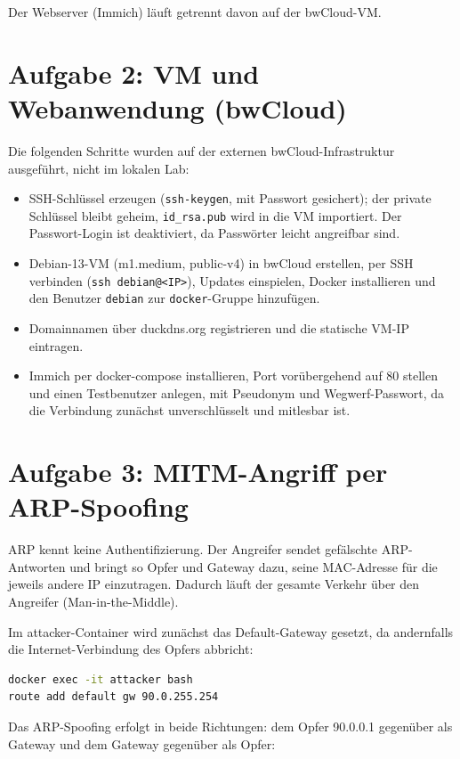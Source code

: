 \documentclass[
	fontsize=12pt,
	paper=a4,
	numbers=noenddot,
	listof=totoc,
	listof=entryprefix,
	listof=nochaptergap,
	bibliography=totoc,
	parskip=half,
	openany
]{scrbook}
\begin{document}
Der Webserver (Immich) läuft getrennt davon auf der bwCloud-VM.

\chapter*{Aufgabe 2: VM und Webanwendung (bwCloud)}

Die folgenden Schritte wurden auf der externen bwCloud-Infrastruktur ausgeführt,
nicht im lokalen Lab:

\begin{itemize}
	\item SSH-Schlüssel erzeugen (\texttt{ssh-keygen}, mit Passwort gesichert);
	      der private Schlüssel bleibt geheim, \texttt{id\_rsa.pub} wird in die
	      VM importiert. Der Passwort-Login ist deaktiviert, da Passwörter leicht
	      angreifbar sind.
	\item Debian-13-VM (m1.medium, public-v4) in bwCloud erstellen, per SSH
	      verbinden (\texttt{ssh debian@<IP>}), Updates einspielen, Docker
	      installieren und den Benutzer \texttt{debian} zur \texttt{docker}-Gruppe
	      hinzufügen.
	\item Domainnamen über duckdns.org registrieren und die statische VM-IP
	      eintragen.
	\item Immich per docker-compose installieren, Port vorübergehend auf 80
	      stellen und einen Testbenutzer anlegen, mit Pseudonym und
	      Wegwerf-Passwort, da die Verbindung zunächst unverschlüsselt und
	      mitlesbar ist.
\end{itemize}

\chapter*{Aufgabe 3: MITM-Angriff per ARP-Spoofing}

ARP kennt keine Authentifizierung. Der Angreifer sendet gefälschte ARP-Antworten
und bringt so Opfer und Gateway dazu, seine MAC-Adresse für die jeweils andere IP
einzutragen. Dadurch läuft der gesamte Verkehr über den Angreifer
(Man-in-the-Middle).

Im attacker-Container wird zunächst das Default-Gateway gesetzt, da andernfalls
die Internet-Verbindung des Opfers abbricht:

\begin{lstlisting}[language=bash]
docker exec -it attacker bash
route add default gw 90.0.255.254
\end{lstlisting}

Das ARP-Spoofing erfolgt in beide Richtungen: dem Opfer 90.0.0.1 gegenüber als
Gateway und dem Gateway gegenüber als Opfer:
\end{document}
